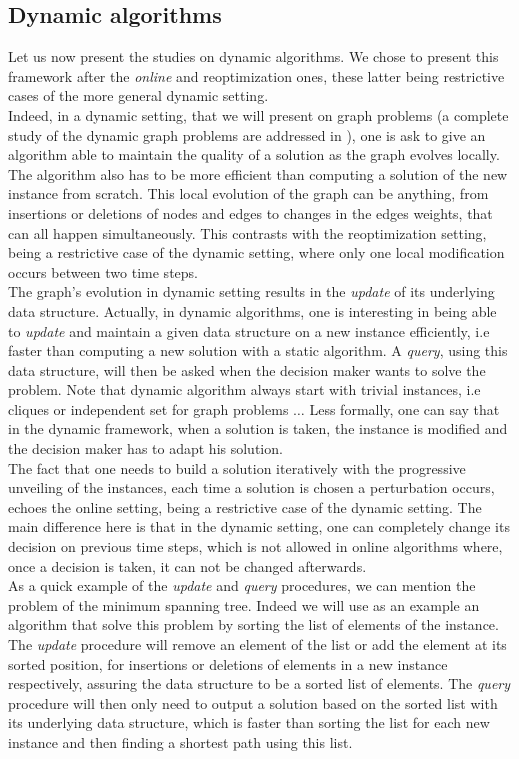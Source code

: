 \documentclass[a4paper]{book}
\begin{document}
\subsection{Dynamic algorithms }
Let us now present the studies on dynamic algorithms. We chose to present this framework after the \textit{online} and reoptimization ones, these latter being restrictive cases of the more general dynamic setting. \\
Indeed, in a dynamic setting, that we will present on graph problems (a complete study of the dynamic graph problems are addressed in \cite{99/EppsteinGI99}), one is ask to give an algorithm able to maintain the quality of a solution as the graph evolves locally. The algorithm also has to be more efficient than computing a solution of the new instance from scratch. This local evolution of the graph can be anything, from insertions or deletions of nodes and edges to changes in the edges weights, that can all happen simultaneously. This contrasts with the reoptimization setting, being a restrictive case of the dynamic setting, where only one local modification occurs between two time steps.\\
The graph's evolution in dynamic setting results in the \textit{update} of its underlying data structure. Actually, in dynamic algorithms, one is interesting in being able to \textit{update} and maintain a given data structure on a new instance efficiently, i.e faster than computing a new solution with a static algorithm. A \textit{query}, using this data structure, will then be asked when the decision maker wants to solve the problem. Note that dynamic algorithm always start with trivial instances, i.e cliques or independent set for graph problems $\ldots$ Less formally, one can say that in the dynamic framework, when a solution is taken, the instance is modified and the decision maker has to adapt his solution. \\
The fact that one needs to build a solution iteratively with the progressive unveiling of the instances, each time a solution is chosen a perturbation occurs, echoes the online setting, being a restrictive case of the dynamic setting. The main difference here is that in the dynamic setting, one can completely change its decision on previous time steps, which is not allowed in online algorithms where, once a decision is taken, it can not be changed afterwards.\\
As a quick example of the \textit{update} and \textit{query} procedures, we can mention the problem of the {\sc minimum spanning tree}. Indeed we will use as an example an algorithm that solve this problem by sorting the list of elements of the instance. The \textit{update} procedure will remove an element of the list or add the element at its sorted position, for insertions or deletions of elements in a new instance respectively, assuring the data structure to be a sorted list of elements. The \textit{query} procedure will then only need to output a solution based on the sorted list with its underlying data structure, which is faster than sorting the list for each new instance and then finding a shortest path using this list. \\
\end{document}
